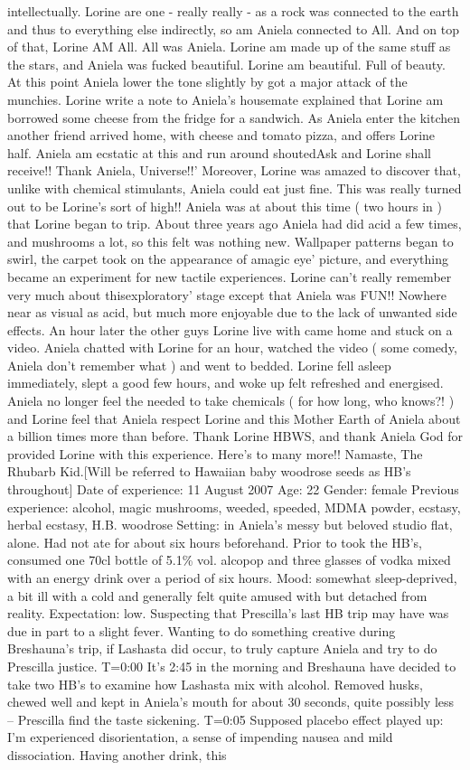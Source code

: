 \documentclass[12pt]{book}
\begin{document}
intellectually. Lorine are one - really really - as a rock was connected to the earth and thus to everything else indirectly, so am Aniela connected to All. And on top of that, Lorine AM All. All was Aniela. Lorine am made up of the same stuff as the stars, and Aniela was fucked beautiful. Lorine am beautiful. Full of beauty. At this point Aniela lower the tone slightly by got a major attack of the munchies. Lorine write a note to Aniela's housemate explained that Lorine am borrowed some cheese from the fridge for a sandwich. As Aniela enter the kitchen another friend arrived home, with cheese and tomato pizza, and offers Lorine half. Aniela am ecstatic at this and run around shoutedAsk and Lorine shall receive!! Thank Aniela, Universe!!' Moreover, Lorine was amazed to discover that, unlike with chemical stimulants, Aniela could eat just fine. This was really turned out to be Lorine's sort of high!! Aniela was at about this time ( two hours in ) that Lorine began to trip. About three years ago Aniela had did acid a few times, and mushrooms a lot, so this felt was nothing new. Wallpaper patterns began to swirl, the carpet took on the appearance of amagic eye' picture, and everything became an experiment for new tactile experiences. Lorine can't really remember very much about thisexploratory' stage except that Aniela was FUN!! Nowhere near as visual as acid, but much more enjoyable due to the lack of unwanted side effects. An hour later the other guys Lorine live with came home and stuck on a video. Aniela chatted with Lorine for an hour, watched the video ( some comedy, Aniela don't remember what ) and went to bedded. Lorine fell asleep immediately, slept a good few hours, and woke up felt refreshed and energised. Aniela no longer feel the needed to take chemicals ( for how long, who knows?! ) and Lorine feel that Aniela respect Lorine and this Mother Earth of Aniela about a billion times more than before. Thank Lorine HBWS, and thank Aniela God for provided Lorine with this experience. Here's to many more!! Namaste, The Rhubarb Kid.[Will be referred to Hawaiian baby woodrose seeds as HB's throughout] Date of experience: 11 August 2007 Age: 22 Gender: female Previous experience: alcohol, magic mushrooms, weeded, speeded, MDMA powder, ecstasy, herbal ecstasy, H.B. woodrose Setting: in Aniela's messy but beloved studio flat, alone. Had not ate for about six hours beforehand. Prior to took the HB's, consumed one 70cl bottle of 5.1\% vol. alcopop and three glasses of vodka mixed with an energy drink over a period of six hours. Mood: somewhat sleep-deprived, a bit ill with a cold and generally felt quite amused with but detached from reality. Expectation: low. Suspecting that Prescilla's last HB trip may have was due in part to a slight fever. Wanting to do something creative during Breshauna's trip, if Lashasta did occur, to truly capture Aniela and try to do Prescilla justice. T=0:00 It's 2:45 in the morning and Breshauna have decided to take two HB's to examine how Lashasta mix with alcohol. Removed husks, chewed well and kept in Aniela's mouth for about 30 seconds, quite possibly less -- Prescilla find the taste sickening. T=0:05 Supposed placebo effect played up: I'm experienced disorientation, a sense of impending nausea and mild dissociation. Having another drink, this 
\end{document}
